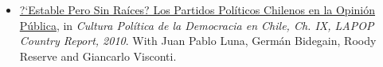 \begin{itemize}
\item[\textcolor{gray}{\textbullet}] \href{http://www.vanderbilt.edu/lapop/chile/Chile-2010-cultura-politica.pdf}{?`Estable Pero Sin Ra\'ices? Los Partidos Pol\'iticos Chilenos en la Opini\'on P\'ublica}, in \emph{Cultura Pol\'itica de la Democracia en Chile, Ch. IX, LAPOP Country Report, 2010}. With Juan Pablo Luna, Germ\'an Bidegain, Roody Reserve and Giancarlo Visconti.
\end{itemize}



